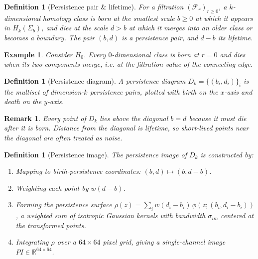 \documentclass[11pt,letterpaper]{article}
\newcommand{\R}{\mathbb{R}}
\newcommand{\1}{\mathds{1}}
\newcommand{\simpcom}{\Sigma}
\newcommand{\filt}{\mathcal{F}}
\theoremstyle{plain}
\theoremstyle{definitioncolon}
\newtheorem{definition}[theorem]{Definition}
\newtheorem*{example}{Example}
\newtheorem*{remark}{Remark}
\begin{document}
    \begin{definition}[Persistence pair \& lifetime]
        For a filtration $(\filt_r)_{r \geq 0}$, a $k$-dimensional homology
        class is \emph{born} at the smallest scale $b \geq 0$ at which it
        appears in $H_k(\simpcom_b)$, and \emph{dies} at the scale $d > b$ at
        which it merges into an older class or becomes a boundary. The pair
        $(b,d)$ is a \emph{persistence pair}, and $d - b$ its \emph{lifetime}.
    \end{definition}

    \begin{example}
        Consider $H_0$. Every $0$-dimensional class is born at $r=0$ and dies
        when its two components merge, i.e. at the filtration value of the
        connecting edge.
    \end{example}

    \begin{definition}[Persistence diagram]
        A persistence diagram $D_k = \{(b_i, d_i)\}_i$ is the multiset of
        dimension-$k$ persistence pairs, plotted with birth on the $x$-axis and
        death on the $y$-axis.
    \end{definition}

    \begin{remark}
        Every point of $D_k$ lies above the diagonal $b=d$ because it must die
        after it is born. Distance from the diagonal is lifetime, so short-lived
        points near the diagonal are often treated as noise.
    \end{remark}

    \begin{definition}[Persistence image]
    \label{def:per_image}
        The persistence image of $D_k$ is constructed by:
            \begin{enumerate}
                \item Mapping to birth-persistence coordinates:
                      $(b,d) \mapsto (b, d-b)$.
                \item Weighting each point by $w(d-b)$.
                \item Forming the persistence surface
                      $\rho(z) = \sum_i w(d_i - b_i)\,
                      \phi(z; (b_i, d_i - b_i))$, a weighted sum of isotropic
                      Gaussian kernels with bandwidth $\sigma_{im}$ centered at
                      the transformed points.
                \item Integrating $\rho$ over a $64 \times 64$ pixel grid,
                      giving a single-channel image $PI \in \R^{64 \times 64}$.
            \end{enumerate}
    \end{definition}
\end{document}
